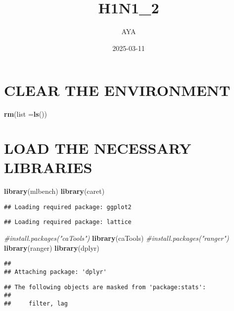 \documentclass[
]{article}
\title{H1N1\_2}
\author{AYA}
\date{2025-03-11}
\newenvironment{Shaded}{\begin{snugshade}}{\end{snugshade}}
\newcommand{\AttributeTok}[1]{\textcolor[rgb]{0.13,0.29,0.53}{#1}}
\newcommand{\CommentTok}[1]{\textcolor[rgb]{0.56,0.35,0.01}{\textit{#1}}}
\newcommand{\FunctionTok}[1]{\textcolor[rgb]{0.13,0.29,0.53}{\textbf{#1}}}
\newcommand{\NormalTok}[1]{#1}
\begin{document}
\maketitle

\section{CLEAR THE ENVIRONMENT}\label{clear-the-environment}

\begin{Shaded}
\begin{Highlighting}[]
\FunctionTok{rm}\NormalTok{(}\AttributeTok{list  =}\FunctionTok{ls}\NormalTok{())}
\end{Highlighting}
\end{Shaded}

\section{LOAD THE NECESSARY
LIBRARIES}\label{load-the-necessary-libraries}

\begin{Shaded}
\begin{Highlighting}[]
\FunctionTok{library}\NormalTok{(mlbench)}
\FunctionTok{library}\NormalTok{(caret)}
\end{Highlighting}
\end{Shaded}

\begin{verbatim}
## Loading required package: ggplot2
\end{verbatim}

\begin{verbatim}
## Loading required package: lattice
\end{verbatim}

\begin{Shaded}
\begin{Highlighting}[]
\CommentTok{\#install.packages("caTools")}
\FunctionTok{library}\NormalTok{(caTools)}
\CommentTok{\#install.packages("ranger")}
\FunctionTok{library}\NormalTok{(ranger)}
\FunctionTok{library}\NormalTok{(dplyr)}
\end{Highlighting}
\end{Shaded}

\begin{verbatim}
## 
## Attaching package: 'dplyr'
\end{verbatim}

\begin{verbatim}
## The following objects are masked from 'package:stats':
## 
##     filter, lag
\end{verbatim}
\end{document}
